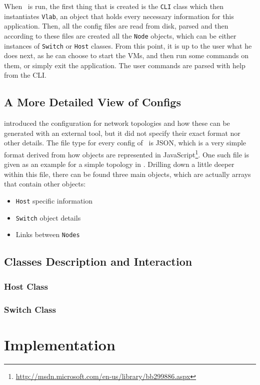 When \project\ is run, the first thing that is created is the \texttt{CLI} class which then instantiates \texttt{Vlab}, an object that holds every necessary information for this application.
Then, all the config files are read from disk, parsed and then according to these files are created all the \texttt{Node} objects, which can be either instances of \texttt{Switch} or \texttt{Host} classes.
From this point, it is up to the user what he does next, as he can choose to start the VMs, and then run some commands on them, or simply exit the application.
The user commands are parsed with help from the CLI.

\subsection{A More Detailed View of Configs}
\label{sub-sec:configs-detalied}

 introduced the configuration for network topologies and how these can be generated with an external tool, but it did not specify their exact format nor other details.
The file type for every config of \project\ is JSON, which is a very simple format derived from how objects are represented in JavaScript\footnote{\url{http://msdn.microsoft.com/en-us/library/bb299886.aspx}}.
One such file is given as an example for a simple topology in .
Drilling down a little deeper within this file, there can be found three main objects, which are actually arrays that contain other objects:
\begin{itemize}
  \item \texttt{Host} specific information
  \item \texttt{Switch} object details
  \item Links between \texttt{Nodes}
\end{itemize}


\subsection{Classes Description and Interaction}
\label{sub-sec:classes-description-interaction}


\subsubsection{Host Class}

\subsubsection{Switch Class}

\section{Implementation}
\label{sec:implementation}

